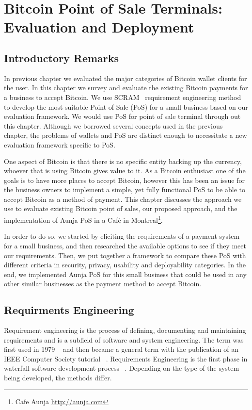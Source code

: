 
\chapter{Bitcoin Point of Sale Terminals: Evaluation and Deployment}


\section{Introductory Remarks}

In previous chapter we evaluated the major categories of Bitcoin wallet clients for the user. In this chapter we survey and evaluate the existing Bitcoin payments for a business to accept Bitcoin. We use SCRAM~\cite{REScenario}  requirement engineering method to develop the most suitable Point of Sale (PoS) for a small business based on our evaluation framework. We would use PoS for point of sale terminal through out this chapter. Although we borrowed several concepts used in the previous chapter, the problems of wallets and PoS are distinct enough to necessitate a new evaluation framework specific to PoS.

One aspect of Bitcoin is that there is no specific entity backing up the currency, whoever that is using Bitcoin gives value to it. As a Bitcoin enthusiast one of the goals is to have more places to accept Bitcoin, however this has been an issue for the business owners to implement a simple, yet fully functional PoS to be able to accept Bitcoin as a method of payment.
This chapter discusses the approach we use to evaluate existing Bitcoin point of sales, our proposed approach, and the implementation of Aunja PoS in a Caf\'{e} in Montreal\footnote{ Cafe Aunja \url{http://aunja.com}}.

In order to do so, we started by eliciting the requirements of a payment system for a small business, and then researched the available options to see if they meet our requirements. Then, we put together a framework to compare these PoS with different criteria in security, privacy, usability and deployability categories. In the end, we implemented Aunja PoS for this small business that could be used in any other similar businesses as the payment method to accept Bitcoin.

\section {Requirments Engineering}
Requirement engineering is the process of defining, documenting and maintaining requirements and is a subfield of software and system engineering. The term was first used in 1979 ~\cite{alford1979software} and then became a general term with the publication of an IEEE Computer Society tutorial ~\cite{dorfman1990system}.
Requirements Engineering is the first phase in waterfall software development process ~\cite{rocye1970managing}. Depending on the type of the system being developed, the methods differ.

